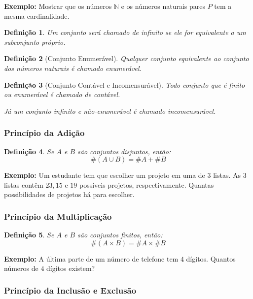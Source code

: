 \documentclass[oneside,a4paper,12pt]{article}
\newtheorem{definition}{Definição}[section]
\begin{document}
{\bf Exemplo: } Mostrar que os números $\mathbb{N}$ e os números naturais pares $P$ tem a mesma cardinalidade.

\vspace{200pt}

\begin{definition}
	Um conjunto será chamado de infinito se ele for equivalente a um subconjunto próprio.
\end{definition}

\begin{definition}[Conjunto Enumerável]
	Qualquer conjunto equivalente ao conjunto dos números naturais é chamado {\it enumerável}.
\end{definition}

\begin{definition}[Conjunto Contável e Incomensurável]
	Todo conjunto que é finito ou enumerável é chamado de {\it contável}.
	
	Já um conjunto infinito e não-enumerável é chamado {\it incomensurável}.
\end{definition}

\subsubsection{Princípio da Adição}
\begin{definition}
	Se $A$ e $B$ são conjuntos disjuntos, então:
	$$\#(A \cup B) = \#A + \#B$$
\end{definition}

{\bf Exemplo: } Um estudante tem que escolher um projeto em uma de $3$ listas. As $3$ listas contêm $23, 15$ e $19$ possíveis projetos, respectivamente. Quantas possibilidades de projetos há para escolher.

\subsubsection{Princípio da Multiplicação}

\begin{definition}
	Se $A$ e $B$ são conjuntos finitos, então: $$\#(A \times B) = \#A \times \#B$$
\end{definition}

{\bf Exemplo: }A última parte de um número de telefone tem $4$ dígitos. Quantos números de $4$ dígitos existem?

\subsubsection{Princípio da Inclusão e Exclusão}
\end{document}
